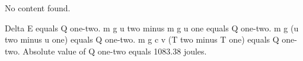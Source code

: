No content found.

Delta E equals Q one-two.  
m g u two minus m g u one equals Q one-two.  
m g (u two minus u one) equals Q one-two.  
m g c v (T two minus T one) equals Q one-two.  
Absolute value of Q one-two equals 1083.38 joules.
